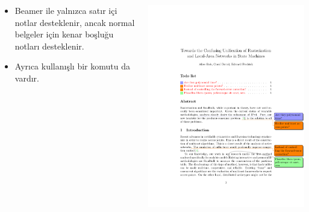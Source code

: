 \documentclass[aspectratio=169]{beamer}
\begin{document}
\begin{frame}[fragile]{\insertsection}
\begin{columns}
  \begin{column}{0.4\textwidth}
    \begin{itemize}
    \item Beamer ile yalnızca satır içi notlar desteklenir, ancak normal belgeler için kenar boşluğu notları desteklenir.
    \item Ayrıca kullanışlı bir  komutu da vardır.
    \end{itemize}
  \end{column}
  \begin{column}{0.6\textwidth}
    \includegraphics[width=\textwidth,page=1]{todonotes-example}
  \end{column}
\end{columns}
\end{frame}
\end{document}
